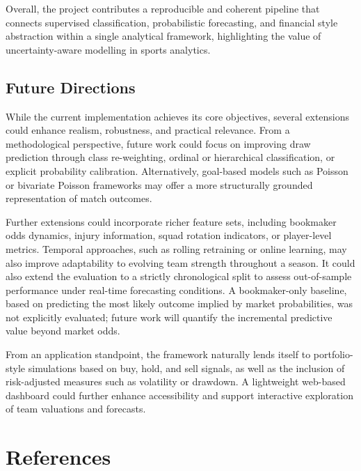 \documentclass[11pt,a4paper]{article}
\begin{document}
Overall, the project contributes a reproducible and coherent pipeline that connects supervised classification, probabilistic forecasting, and financial style abstraction within a single analytical framework, highlighting the value of uncertainty-aware modelling in sports analytics.

\subsection{Future Directions}

While the current implementation achieves its core objectives, several extensions could enhance realism, robustness, and practical relevance. From a methodological perspective, future work could focus on improving draw prediction through class re-weighting, ordinal or hierarchical classification, or explicit probability calibration. Alternatively, goal-based models such as Poisson or bivariate Poisson frameworks may offer a more structurally grounded representation of match outcomes.

Further extensions could incorporate richer feature sets, including bookmaker odds dynamics, injury information, squad rotation indicators, or player-level metrics. Temporal approaches, such as rolling retraining or online learning, may also improve adaptability to evolving team strength throughout a season. It could also extend the evaluation to a strictly chronological split to assess out-of-sample performance under real-time forecasting conditions. A bookmaker-only baseline, based on predicting the most likely outcome implied by market probabilities, was not explicitly evaluated; future work will quantify the incremental predictive value beyond market odds.

From an application standpoint, the framework naturally lends itself to portfolio-style simulations based on buy, hold, and sell signals, as well as the inclusion of risk-adjusted measures such as volatility or drawdown. A lightweight web-based dashboard could further enhance accessibility and support interactive exploration of team valuations and forecasts.

\newpage
\section*{References}
\sloppy
\end{document}
